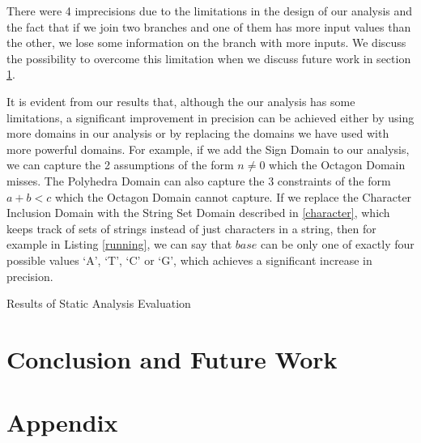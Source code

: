 \documentclass[10pt]{report}
\begin{document}
There were 4 imprecisions due to the limitations in the design of our analysis and the fact that if we join two branches and one of them has more input values than the other, we lose some information on the branch with more inputs. We discuss the possibility to overcome this limitation when we discuss future work in section \ref{conclusion}. 

It is evident from our results that, although the our analysis has some limitations, a significant improvement in precision can be achieved either by using more domains in our analysis or by replacing the domains we have used with more powerful domains. For example, if we add the Sign Domain to our analysis, we can capture the 2 assumptions of the form $ n \neq 0 $ which the Octagon Domain misses. The Polyhedra Domain can also capture the 3 constraints of the form $ a + b < c $ which the Octagon Domain cannot capture. If we replace the Character Inclusion Domain with the String Set Domain described in \ref{character}, which keeps track of sets of strings instead of just characters in a string, then for example in Listing \ref{running}, we can say that $ base $ can be only one of exactly four possible values `A', `T', `C' or `G', which achieves a significant increase in precision. 


\begin{table}  \caption{Results of Static Analysis Evaluation} \label{table}
	\let\center\empty
	\let\endcenter\relax
	\centering
	
\end{table}

\chapter{Conclusion and Future Work} \label{conclusion}


\appendix
\chapter{Appendix} 





\end{document}
